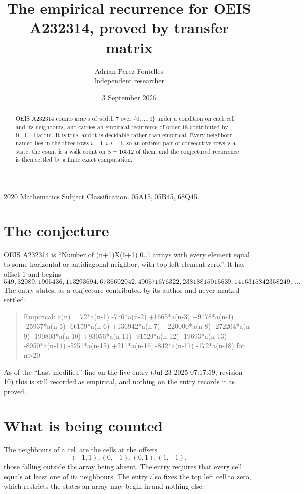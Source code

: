 \documentclass[11pt,a4paper]{article}
\title{The empirical recurrence for OEIS A232314, proved by transfer matrix}
\author{Adrian Perez Fontelles\\ \small Independent researcher}
\date{3 September 2026}
\theoremstyle{plain}
\theoremstyle{definition}
\begin{document}
\maketitle

\begin{abstract}
OEIS A232314 counts arrays of width $7$ over $\{0,\dots,1\}$ under a condition on each cell
and its neighbours, and carries an empirical recurrence of order $18$ contributed by
R.~H.~Hardin. It is true, and it is decidable rather than empirical. Every neighbour named lies
in the three rows $i-1,i,i+1$, so an ordered pair of consecutive rows is a state, the count is
a walk count on $S=16512$ of them, and the conjectured recurrence is then settled by a finite
exact computation.
\end{abstract}

\noindent\small 2020 Mathematics Subject Classification. 05A15, 05B45, 68Q45.\normalsize

\section{The conjecture}

OEIS A232314 is ``Number of (n+1)X(6+1) 0..1 arrays with every element equal to some horizontal or antidiagonal neighbor, with top left element zero.''. It has offset $1$ and begins
\[
549, 32089, 1905436, 113293694, 6736602042, 400571676322, 23818815015639, 1416315842358249,\ \dots
\]
The entry states, as a conjecture contributed by its author and never marked settled:
\begin{quote}
Empirical: a(n) = 72*a(n-1) -776*a(n-2) +1665*a(n-3) +9178*a(n-4) -25937*a(n-5) -66159*a(n-6) +136942*a(n-7) +220000*a(n-8) -272204*a(n-9) -190803*a(n-10) +93056*a(n-11) -91520*a(n-12) -19693*a(n-13) -8950*a(n-14) -5251*a(n-15) +211*a(n-16) -842*a(n-17) -172*a(n-18) for n>20
\end{quote}
As of the ``Last modified'' line on the live entry (Jul 23 2025 07:17:59, revision 10) this is still
recorded as empirical, and nothing on the entry records it as proved.

\section{What is being counted}

The neighbours of a cell are the cells at the offsets
\[
(-1,1), (0,-1), (0,1), (1,-1),
\]
those falling outside the array being absent. The entry requires that every cell equals at least one of its neighbours. The entry also fixes the top left cell to zero, which restricts the states an array may begin in and nothing else.
\end{document}
